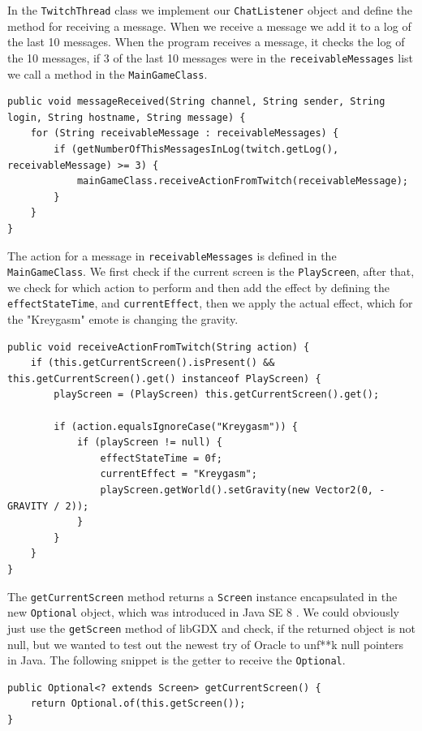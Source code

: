 \documentclass[12p]{article}
\begin{document}
In the \texttt{TwitchThread} class we implement our \texttt{ChatListener} object and define the method for receiving a message. When we receive a message we add it to a log of the last 10 messages. When the program receives a message, it checks the log of the 10 messages, if 3 of the last 10 messages were in the \texttt{receivableMessages} list we call a method in the \texttt{MainGameClass}.

\begin{verbatim}
public void messageReceived(String channel, String sender, String login, String hostname, String message) {
    for (String receivableMessage : receivableMessages) {
        if (getNumberOfThisMessagesInLog(twitch.getLog(), receivableMessage) >= 3) {
            mainGameClass.receiveActionFromTwitch(receivableMessage);
        }
    }
}
\end{verbatim}

The action for a message in \texttt{receivableMessages} is defined in the \texttt{MainGameClass}. We first check if the current screen is the \texttt{PlayScreen}, after that, we check for which action to perform and then add the effect by defining the \texttt{effectStateTime}, and \texttt{currentEffect}, then we apply the actual effect, which for the "Kreygasm" emote is changing the gravity.

\begin{verbatim}
public void receiveActionFromTwitch(String action) {
	if (this.getCurrentScreen().isPresent() && this.getCurrentScreen().get() instanceof PlayScreen) {
		playScreen = (PlayScreen) this.getCurrentScreen().get();

		if (action.equalsIgnoreCase("Kreygasm")) {
		    if (playScreen != null) {
		        effectStateTime = 0f;
		        currentEffect = "Kreygasm";
                playScreen.getWorld().setGravity(new Vector2(0, - GRAVITY / 2));
            }
		}
	}
}
\end{verbatim}

The \texttt{getCurrentScreen} method returns a \texttt{Screen} instance encapsulated in the new \texttt{Optional} object, which was introduced in Java SE 8 \cite{JavaOptional}. We could obviously just use the \texttt{getScreen} method of libGDX and check, if the returned object is not null, but we wanted to test out the newest try of Oracle to unf**k null pointers in Java. The following snippet is the getter to receive the \texttt{Optional}.

\begin{verbatim}
public Optional<? extends Screen> getCurrentScreen() {
    return Optional.of(this.getScreen());
}
\end{verbatim}
\end{document}
